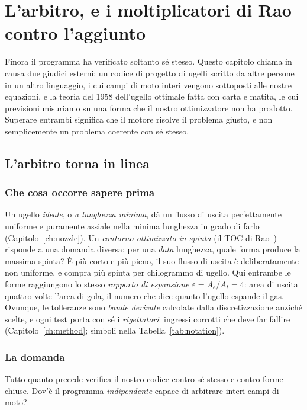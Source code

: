 \chapter{L'arbitro, e i moltiplicatori di Rao contro l'aggiunto}
\label{ch:referee}

Finora il programma ha verificato soltanto sé stesso. Questo capitolo
chiama in causa due giudici esterni: un codice di progetto di ugelli
scritto da altre persone in un altro linguaggio, i cui campi di moto
interi vengono sottoposti alle nostre equazioni, e la teoria del 1958
dell'ugello ottimale fatta con carta e matita, le cui previsioni
misuriamo su una forma che il nostro ottimizzatore non ha prodotto.
Superare entrambi significa che il motore risolve il problema giusto,
e non semplicemente un problema coerente con sé stesso.

\section{L'arbitro torna in linea}

\subsection{Che cosa occorre sapere prima}

Un ugello \emph{ideale}, o \emph{a lunghezza minima}, dà un flusso di
uscita perfettamente uniforme e puramente assiale nella minima
lunghezza in grado di farlo (Capitolo~\ref{ch:nozzle}). Un
\emph{contorno ottimizzato in spinta} (il TOC di Rao~\cite{rao})
risponde a una domanda diversa: per una \emph{data} lunghezza, quale
forma produce la massima spinta? È più corto e più pieno, il suo
flusso di uscita è deliberatamente non uniforme, e compra più spinta
per chilogrammo di ugello. Qui entrambe le forme raggiungono lo
stesso \emph{rapporto di espansione} $\varepsilon = A_e/A_t = 4$:
area di uscita quattro volte l'area di gola, il numero che dice
quanto l'ugello espande il gas. Ovunque, le tolleranze sono
\emph{bande derivate} calcolate dalla discretizzazione anziché
scelte, e ogni test porta con sé i \emph{rigettatori}: ingressi
corrotti che deve far fallire (Capitolo~\ref{ch:method}; simboli
nella Tabella~\ref{tab:notation}).

\subsection{La domanda}

Tutto quanto precede verifica il nostro codice contro sé stesso e
contro forme chiuse. Dov'è il programma \emph{indipendente} capace di
arbitrare interi campi di moto?

